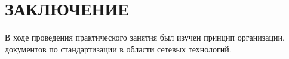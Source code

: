 \section*{ЗАКЛЮЧЕНИЕ}

В ходе проведения практического занятия был изучен принцип организации,
документов по стандартизации в области сетевых технологий.

\newpage